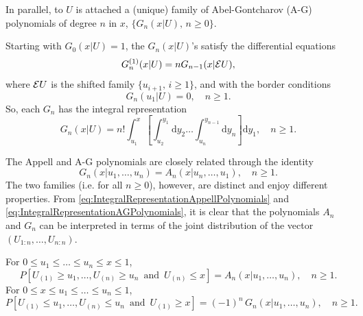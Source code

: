 In parallel, to $U$ is attached a (unique) family of Abel-Gontcharov (A-G) polynomials of degree $n$ in $x$, $\{G_{n}(x\vert U),\, n\geq 0\}$.
\begin{definition} 
Starting with $G_0(x\vert U)=1$, the $G_n(x\vert U)$'s satisfy the differential equations
\begin{equation}\label{eq:DifferentialEquationAGPolynomials}
G_n^{(1)}(x|U)=nG_{n-1}(x|{\cal E}U), 
\end{equation}
where ${\cal E}U$ is the shifted family $\{u_{i+1}, \, i\geq 1\}$, and with the border conditions
\begin{equation}\label{eq:Border AGPolynomial}
G_{n}(u_{1}|U)=0, \quad  n\geq 1.
\end{equation}
So, each $G_n$ has the integral representation
\begin{equation}\label{eq:IntegralRepresentationAGPolynomials}
G_{n}(x|U)=n!\int_{u_{1}}^{x}\left[\int_{u_{2}}^{y_{1}}\text{d}y_{2} \ldots \int_{u_{n}}^{y_{n-1}}\text{d}y_{n}\right]\text{d}y_{1}, \quad n\geq 1.
\end{equation}
\end{definition}
\noindent The Appell and A-G polynomials are closely related through the identity
\begin{equation}\label{eq:link_AG_Appell}
G_{n}(x|u_{1},\ldots,u_{n})=A_{n}(x|u_{n},\ldots,u_{1}), \quad n\geq 1.
\end{equation}
The two families (i.e. for all $n\geq 0$), however, are distinct and enjoy different properties. From \eqref{eq:IntegralRepresentationAppellPolynomials} and \eqref{eq:IntegralRepresentationAGPolynomials}, it is clear that the polynomials $A_n$ and $G_n$ can be interpreted in terms of the joint distribution of the vector $(U_{1:n},\ldots,U_{n:n})$. 
\begin{prop}
For $0\leq u_1 \leq \ldots \leq u_{n} \leq x \leq 1$,
\begin{equation}\label{eq:ProbabilisticInterpretationAppellPolynomials}
P[U_{(1)} \geq u_1, \ldots, U_{(n)} \geq u_{n}\, \mbox{ and }\, U_{(n)}\leq x]= 
A_n(x \vert u_1, \ldots, u_{n}), \quad n\geq1.
\end{equation}
For $0\leq x \leq u_1 \leq \ldots \leq u_{n} \leq 1$,
\begin{equation}\label{eq:ProbabilisticInterpretationAGPolynomials}
P[U_{(1)} \leq u_1, \ldots, U_{(n)} \leq u_{n}\, \mbox{ and }\, U_{(1)}\geq x]
= (-1)^n \, G_n(x \vert u_1, \ldots, u_{n}), \quad n\geq 1.
\end{equation}
\end{prop}
